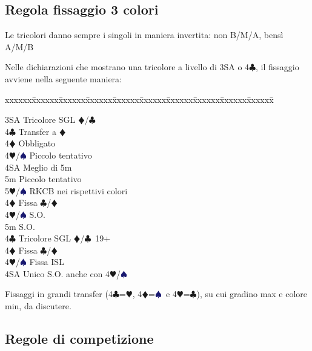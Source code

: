 \documentclass[a4paper,italian]{article}
\newcommand{\BC}{\textcolor{OliveGreen}{$\clubsuit$}}
\newcommand{\BD}{\textcolor{RedOrange}{$\vardiamondsuit$}}
\newcommand{\BH}{\textcolor{Red2}{$\varheartsuit${}}}
\newcommand{\BS}{\textcolor{MidnightBlue}{$\spadesuit${}}}
\newenvironment{bidtable}
{\begin{tabbing}

    xxxxxx\=xxxxxx\=xxxxxx\=xxxxxx\=xxxxxx\=xxxxxx\=xxxxxx\=xxxxxx\=xxxxxx\=xxxxxx\=\kill}
{\end{tabbing} }%
\newenvironment{attenzione}[1]
{\begin{tcolorbox}[colframe=red!80!white,title=#1]}
    {
\end{tcolorbox} }%
\newenvironment{varie}[1]
{\begin{tcolorbox}[colframe=green!40!black,title=#1]}
    {
\end{tcolorbox} }%
\begin{document}
\subsection{Regola fissaggio 3 colori}\label{fissaggi}

\begin{attenzione}{Regola generale per le tricolori}
    Le tricolori danno sempre i singoli in maniera invertita: non B/M/A, bensì A/M/B
\end{attenzione}

Nelle dichiarazioni che mostrano una tricolore a livello di 3SA o 4\BC , il fissaggio avviene nella seguente maniera:
\bigbreak
\begin{bidtable}

    3SA \> Tricolore SGL \BD/\BC\+\\
    4\BC \> Transfer a \BD \+\\
    4\BD \> Obbligato\+\\
    4\BH/\BS \> Piccolo tentativo\\
    4SA \> Meglio di 5m\\
    5m \> Piccolo tentativo\\
    5\BH/\BS \> RKCB nei rispettivi colori\-\-\\
    4\BD \> Fissa \BC/\BD\\
    4\BH/\BS \> S.O.\\
    5m \> S.O.\-\\
    4\BC \> Tricolore SGL \BD/\BC\ 19+\+\\
    4\BD \> Fissa \BC/\BD\\
    4\BH/\BS \> Fissa ISL\\
    4SA \> Unico S.O. anche con 4\BH/\BS\-
\end{bidtable}
\bigbreak
\begin{varie}{Alternativa ai fissaggi}
    Fissaggi in grandi transfer (4\BC =\BH , 4\BD =\BS\ e 4\BH =\BC ), su cui gradino max e colore min, da discutere.
\end{varie}
\setcounter{secnumdepth}{4}

\subsection{Regole di competizione}
\end{document}

